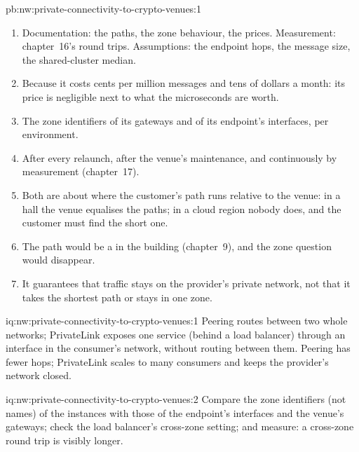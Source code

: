 \begin{solution}{pb:nw:private-connectivity-to-crypto-venues:1}
\begin{enumerate}[resume]
  \qty{360}{\micro\second} to the 99th percentile) and 0.008~USD per million 400-byte messages of cross-zone transfer, on top of 0.004~USD of data
  processing.
\item Documentation: the paths, the zone behaviour, the prices. Measurement: chapter~16's round trips. Assumptions: the endpoint hops, the message
  size, the shared-cluster median.
\item Because it costs cents per million messages and tens of dollars a month: its price is negligible next to what the microseconds are worth.
\item The zone identifiers of its gateways and of its endpoint's interfaces, per environment.
\item After every relaunch, after the venue's maintenance, and continuously by measurement (chapter~17).
\item Both are about where the customer's path runs relative to the venue: in a hall the venue equalises the paths; in a cloud region nobody does, and
  the customer must find the short one.
\item The path would be a  in the building (chapter~9), and the zone question would disappear.
\item It guarantees that traffic stays on the provider's private network, not that it takes the shortest path or stays in one zone.
\end{enumerate}
\end{solution}

\begin{solution}{iq:nw:private-connectivity-to-crypto-venues:1}
Peering routes between two whole networks; PrivateLink exposes one service (behind a load balancer) through an interface in the consumer's network,
without routing between them. Peering has fewer hops; PrivateLink scales to many consumers and keeps the provider's network closed.
\end{solution}

\begin{solution}{iq:nw:private-connectivity-to-crypto-venues:2}
Compare the zone identifiers (not names) of the instances with those of the endpoint's interfaces and the venue's gateways; check the load balancer's
cross-zone setting; and measure: a cross-zone round trip is visibly longer.
\end{solution}

